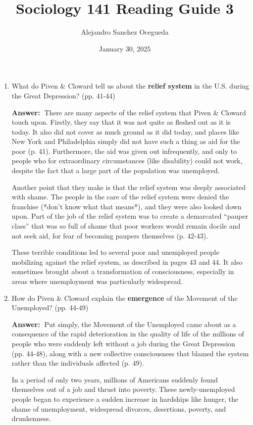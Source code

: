 \documentclass{article}
\title{Sociology 141 Reading Guide 3}
\author{Alejandro Sanchez Ocegueda}
\date{January 30, 2025}
\newcommand{\answer}{\textbf{Answer:}$\;$}
\begin{document}
\maketitle

\begin{enumerate}[label=\arabic*)]
    \item What do Piven \& Cloward tell us about the \textbf{relief system} in the U.S. during the Great Depression? (pp. 41-44)

    \answer 
    There are many aspects of the relief system that Piven \& Cloward touch upon.
    Firstly, they say that it was not quite as fleshed out as it is today.
    It also did not cover as much ground as it did today, and places like New York and Philadelphia simply did not have such a thing as aid for the poor (p. 41).
    Furthermore, the aid was given out infrequently, and only to people who for extraordinary circumstances (like disability) could not work, despite the fact that a large part of the population was unemployed.
    
    Another point that they make is that the relief system was deeply associated with shame.
    The people in the care of the relief system were denied the franchise (*don't know what that means*), and they were also looked down upon.
    Part of the job of the relief system was to create a demarcated ``pauper class'' that was so full of shame that poor workers would remain docile and not seek aid, for fear of becoming paupers themselves (p. 42-43).

    These terrible conditions led to several poor and unemployed people mobilizing against the relief system, as described in pages 43 and 44.
    It also sometimes brought about a transformation of consciousness, especially in areas where unemployment was particularly widespread.

    \item How do Piven \& Cloward explain the \textbf{emergence} of the Movement of the Unemployed? (pp. 44-49)

    \answer
    Put simply, the Movement of the Unemployed came about as a consequence of the rapid deterioration in the quality of life of the millions of people who were suddenly left without a job during the Great Depression (pp. 44-48), along with a new collective consciousness that blamed the system rather than the individuals affected (p. 49).

    In a period of only two years, millions of Americans suddenly found themselves out of a job and thrust into poverty.
    These newly-unemployed people began to experience a sudden increase in hardships like hunger, the shame of unemployment, widespread divorces, desertions, poverty, and drunkenness.
    

\end{enumerate}
\end{document}
